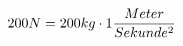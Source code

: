 \documentclass[preview]{standalone}
\begin{document}
\begin{align*}
\special{dvisvgm:raw <g id='unique000'>}200N = 200kg \cdot 1 \frac{Meter}{Sekunde^{2}}\special{dvisvgm:raw </g>}
\end{align*}
\end{document}
